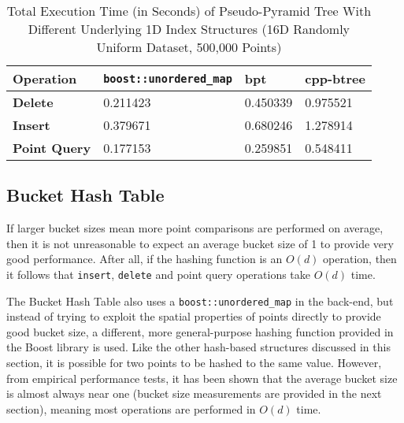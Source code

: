 \begin{table}
	\centering
	\begin{tabular}{|l|l|l|l|}
		\hline
		\textbf{Operation} & \texttt{boost::unordered\_map} & bpt & cpp-btree  \\
		\hline
		\textbf{Delete} & 0.211423 & 0.450339 & 0.975521 \\
		\textbf{Insert} & 0.379671 & 0.680246 & 1.278914 \\
		\textbf{Point Query} & 0.177153 & 0.259851 & 0.548411 \\
		\hline
	\end{tabular}
	\caption{Total Execution Time (in Seconds) of Pseudo-Pyramid Tree With Different Underlying 1D Index Structures (16D Randomly Uniform Dataset, 500,000 Points)}
	\label{tab:hashtable-bplus-time-comparison}
\end{table}

\subsection{Bucket Hash Table}


If larger bucket sizes mean more point comparisons are performed on average, then it is not unreasonable to expect an average bucket size of 1 to provide very good performance. After all, if the hashing function is an $O(d)$ operation, then it follows that \texttt{insert}, \texttt{delete} and point query operations take $O(d)$ time. 

The Bucket Hash Table also uses a \texttt{boost::unordered\_map} in the back-end, but instead of trying to exploit the spatial properties of points directly to provide good bucket size, a different, more general-purpose hashing function provided in the Boost library is used. Like the other hash-based structures discussed in this section, it is possible for two points to be hashed to the same value. However, from empirical performance tests, it has been shown that the average bucket size is almost always near one (bucket size measurements are provided in the next section), meaning most operations are performed in $O(d)$ time.

